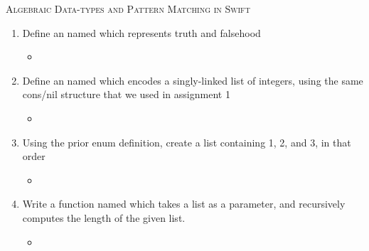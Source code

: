 \documentclass[12pt,a4paper]{article}
\begin{document}
  \begin{center}
    \large\textsc{Algebraic Data-types and Pattern Matching in Swift}
  \end{center}
  \begin{enumerate}
    \item  Define an  named  which represents truth and falsehood
    \begin{itemize}
      \item[]  
    \end{itemize}
    \item  Define an  named  which encodes a singly-linked list of integers, using
    the same cons/nil structure that we used in assignment 1
    \begin{itemize}
      \item[]  
    \end{itemize}
    \item Using the prior enum definition, create a list containing 1, 2, and 3, in that order
    \begin{itemize}
      \item[]  
    \end{itemize}
    \item  Write a function named  which takes a list as a parameter, and recursively
    computes the length of the given list.
    \begin{itemize}
      \item[] 
    \end{itemize}
  \end{enumerate}
\end{document}
